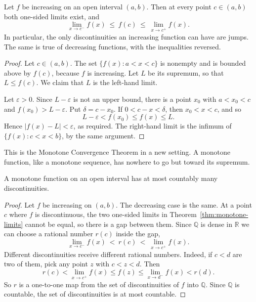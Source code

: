 \begin{theorem}\label{thm:monotone-limits}
Let $f$ be increasing on an open interval $(a,b)$.  Then at every point $c \in (a,b)$ both one-sided limits exist, and
\[ \lim_{x \to c^-} f(x) \ \leq\ f(c)\ \leq\ \lim_{x \to c^+} f(x). \]
In particular, the only discontinuities an increasing function can have are jumps.  The same is true of decreasing functions, with the inequalities reversed.
\end{theorem}

\begin{proof}
Let $c \in (a,b)$.  The set $\{f(x) : a < x < c\}$ is nonempty and is bounded above by $f(c)$, because $f$ is increasing.  Let $L$ be its supremum, so that $L \leq f(c)$.  We claim that $L$ is the left-hand limit.

Let $\varepsilon > 0$.  Since $L - \varepsilon$ is not an upper bound, there is a point $x_0$ with $a < x_0 < c$ and $f(x_0) > L - \varepsilon$.  Put $\delta = c - x_0$.  If $0 < c - x < \delta$, then $x_0 < x < c$, and so
\[ L - \varepsilon < f(x_0) \leq f(x) \leq L. \]
Hence $|f(x) - L| < \varepsilon$, as required.  The right-hand limit is the infimum of $\{f(x) : c < x < b\}$, by the same argument.
\end{proof}

This is the Monotone Convergence Theorem in a new setting.  A monotone function, like a monotone sequence, has nowhere to go but toward its supremum.

\begin{theorem}\label{thm:monotone-countable}
A monotone function on an open interval has at most countably many discontinuities.
\end{theorem}

\begin{proof}
Let $f$ be increasing on $(a,b)$.  The decreasing case is the same.  At a point $c$ where $f$ is discontinuous, the two one-sided limits in Theorem~\ref{thm:monotone-limits} cannot be equal, so there is a gap between them.  Since $\mathbb{Q}$ is dense in $\mathbb{R}$ we can choose a rational number $r(c)$ inside the gap,
\[ \lim_{x \to c^-} f(x) \ <\ r(c)\ <\ \lim_{x \to c^+} f(x). \]
Different discontinuities receive different rational numbers.  Indeed, if $c < d$ are two of them, pick any point $z$ with $c < z < d$.  Then
\[ r(c) < \lim_{x \to c^+} f(x) \leq f(z) \leq \lim_{x \to d^-} f(x) < r(d). \]
So $r$ is a one-to-one map from the set of discontinuities of $f$ into $\mathbb{Q}$.  Since $\mathbb{Q}$ is countable, the set of discontinuities is at most countable.
\end{proof}

